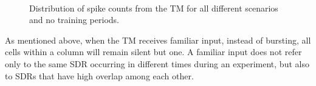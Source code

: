 \documentclass[11pt,letterpaper]{article}
\begin{document}
\begin{figure}[t]
{				    \label{fig18:b}
			    }\\
			    \caption{
			        Distribution of spike counts from the TM for all different scenarios and no training periods.
			    }
			    \label{fig18}
		    \end{figure}		    
            
            As mentioned above, when the TM receives familiar input, instead of bursting, all cells within a column will
            remain silent but one.
            A familiar input does not refer only to the same SDR occurring in different times during an experiment, 
            but also to SDRs that have high overlap among each other.
            
\end{document}
